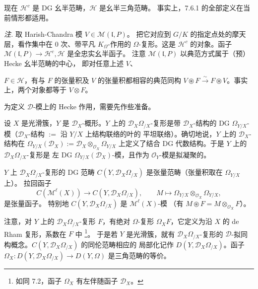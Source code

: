 现在 $\mathcal{H}^{c}$ 是 DG 幺半范畴，$\mathcal{H}$ 是幺半三角范畴。
事实上，7.6.1 的全部定义在当前情形都适用。

\emph{注.} 取 Harish-Chandra 模 $V\in\mathcal{M}(\mathfrak{l},P)$。
把它对应到 $G/K$ 的指定点处的摩天层，看作集中在 $0$ 次、带平凡
$K_{\Omega}$-作用的 $\Omega$-复形。这是 $\mathcal{H}^{c}$ 的对象。函子
$\mathcal{M}(\mathfrak{l},P)\to\mathcal{H}^{c},\mathcal{H}$ 是全忠实幺半函子。
注意 $\mathcal{M}(\mathfrak{l},P)$ 以典范方式属于（预）Hecke 幺半范畴的中心，
即对任意上述 $V$、


$F\in\mathcal{H}$，有与 $F$ 的张量积及 $V$ 的张量积都相容的典范同构
$V\circledast{}F\xrightarrow{\sim}F\circledast{}V$。事实上，两个对象都等于
$V\otimes F$。

 为定义 $\mathcal{D}$-模上的 Hecke 作用，需要先作些准备。

设 $X$ 是光滑簇，$Y$ 是 $\mathcal{D}_{X}$-概形。$Y$ 上的
$\mathcal{D}_{X}\Omega_{/X}$-复形是带 $\mathcal{D}_{X}$-结构的
DG $\Omega_{Y/X}$-模（$\mathcal{D}_{X}$-结构 $:=$ 沿 $Y/X$ 上结构联络的叶的
平坦联络）。确切地说，$Y$ 上的 $\mathcal{D}_{X}$-结构在
$\Omega_{Y/X}(\mathcal{D}_{X}):=\mathcal{D}_{X}\otimes_{\mathcal{O}_{X}}\Omega_{Y/X}$
上定义了结合 DG 代数结构。于是 $Y$ 上的 $\mathcal{D}_{X}\Omega_{/X}$-复形是
左 DG $\Omega_{Y/X}(\mathcal{D}_{X})$-模，且作为 $\mathcal{O}_{Y}$-模是拟凝聚的。

$Y$ 上 $\mathcal{D}_{X}\Omega_{/X}$-复形的 DG 范畴
$C(Y,\mathcal{D}_{X}\Omega_{/X})$ 是张量范畴（张量积取在 $\Omega_{Y/X}$ 上）。
拉回函子
\[
C(\mathcal{M}^{\ell}(X))\longrightarrow C(Y,\mathcal{D}_{X}\Omega_{/X}),
\qquad
M\mapsto\Omega_{Y/X}\otimes_{\mathcal{O}_{X}}\Omega_{Y/X},
\]
是张量函子。
特别地 $C(Y,\mathcal{D}_{X}\Omega_{/X})$ 是 $\mathcal{M}^{\ell}(X)$-模
（有 $M\circledast F=M\otimes_{\mathcal{O}_{X}}F$）。

注意，对 $Y$ 上的 $\mathcal{D}_{X}\Omega_{/X}$-复形 $F$，有绝对 $\Omega$-复形
$\Omega_{X}F$，它定义为沿 $X$ 的 de Rham 复形，系数在 $F$ 中
\footnote{如同 7.2，函子 $\Omega_{X}$ 有左伴随函子 $\mathcal{D}_{X}$。}。
于是若 $Y$ 是光滑簇，就有 $\mathcal{D}_{X}\Omega_{/X}$-复形的
$\mathcal{D}$-拟同构概念。$C(Y,\mathcal{D}_{X}\Omega_{/X})$ 的同伦范畴相应的
局部化记作 $D(Y,\mathcal{D}_{X}\Omega_{/X})$。函子
$\Omega_{X}:D(Y,\mathcal{D}_{X}\Omega_{/X})\longrightarrow D(Y,\Omega)$
是三角范畴的等价。

